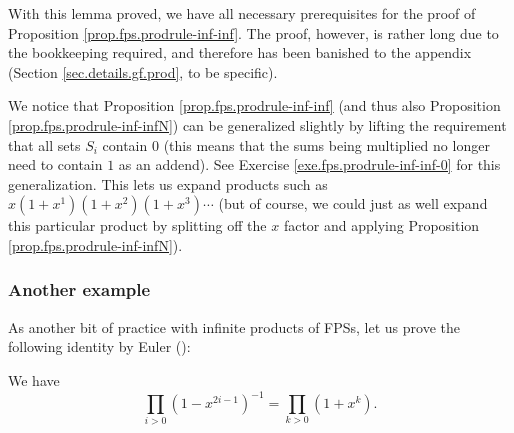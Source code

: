 With this lemma proved, we have all necessary prerequisites for the proof of
Proposition \ref{prop.fps.prodrule-inf-inf}. The proof, however, is rather
long due to the bookkeeping required, and therefore has been banished to the
appendix (Section \ref{sec.details.gf.prod}, to be specific).

We notice that Proposition \ref{prop.fps.prodrule-inf-inf} (and thus also
Proposition \ref{prop.fps.prodrule-inf-infN}) can be generalized slightly by
lifting the requirement that all sets $S_{i}$ contain $0$ (this means that the
sums being multiplied no longer need to contain $1$ as an addend). See
Exercise \ref{exe.fps.prodrule-inf-inf-0} for this generalization. This lets
us expand products such as $x\left(  1+x^{1}\right)  \left(  1+x^{2}\right)
\left(  1+x^{3}\right)  \cdots$ (but of course, we could just as well expand
this particular product by splitting off the $x$ factor and applying
Proposition \ref{prop.fps.prodrule-inf-infN}).

\subsubsection{Another example}

As another bit of practice with infinite products of FPSs, let us prove the
following identity by Euler (\cite[\S 326]{Euler48}):

\begin{proposition}
[Euler]\label{prop.gf.prod.euler-odd}We have%
\[
\prod_{i>0}\left(  1-x^{2i-1}\right)  ^{-1}=\prod_{k>0}\left(  1+x^{k}\right)
.
\]

\end{proposition}

